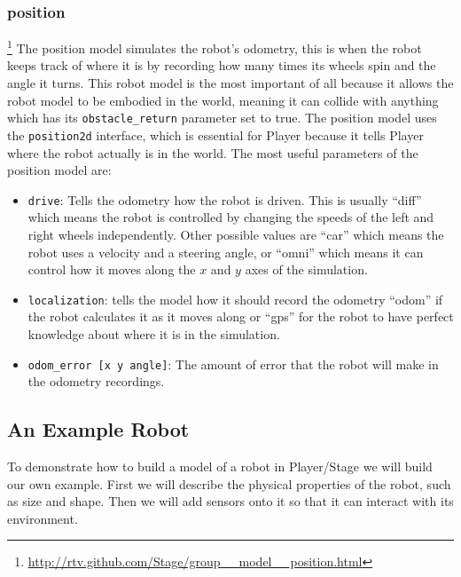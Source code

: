 \documentclass[a4paper]{report}
\newcommand{\plst}{Player/Stage\xspace}
\newcommand{\pl}{Player\xspace}
\begin{document}
\subsubsection{position}\footnote{\url{http://rtv.github.com/Stage/group__model__position.html}}\label{sec:BuildingAWorld:BuildingRobot:RobotSensors:Position}
The position model simulates the robot's odometry, this is when the robot keeps track of where it is by recording how many times its wheels spin and the angle it turns. 
This robot model is the most important of all because it allows the robot model to be embodied in the world, meaning it can collide with anything which has its \verb|obstacle_return| parameter set to true. 
The position model uses the \verb|position2d| interface, which is essential for \pl because it tells \pl where the robot actually is in the world.
The most useful parameters of the position model are:
\begin{itemize}
\item \verb|drive|: Tells the odometry how the robot is driven. This is usually ``diff'' which means the robot is controlled by changing the speeds of the left and right wheels independently. 
Other possible values are ``car'' which means the robot uses a velocity and a steering angle, or ``omni'' which means it can control how it moves along the $x$ and $y$ axes of the simulation.
\item \verb|localization|: tells the model how it should record the odometry ``odom'' if the robot calculates it as it moves along or ``gps'' for the robot to have perfect knowledge about where it is in the simulation. 
\item \verb|odom_error [x y angle]|: The amount of error that the robot will make in the odometry recordings.
\end{itemize}


\subsection{An Example Robot} \label{sec:BuildingAWorld:BuildingRobot:ExampleRobot}

To demonstrate how to build a model of a robot in \plst we will build our own example. First we will describe the physical properties of the robot, such as size and shape. Then we will add sensors onto it so that it can interact with its environment.
\end{document}
